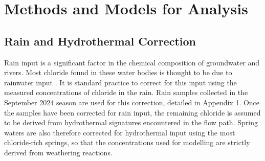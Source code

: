 



\newpage

\section{Methods and Models for Analysis}


\subsection{Rain and Hydrothermal Correction}

Rain input is a significant factor in the chemical composition of groundwater and rivers. Most chloride found in these water bodies is thought to be due to rainwater input \parencite{dreverGeochemistryNaturalWaters1997}. It is standard practice to correct for this input using the measured concentrations of chloride in the rain. Rain samples collected in the September 2024 season are used for this correction, detailed in Appendix 1. Once the samples have been corrected for rain input, the remaining chloride is assumed to be derived from hydrothermal signatures encountered in the flow path. Spring waters are also therefore corrected for hydrothermal input using the most chloride-rich springs, so that the concentrations used for modelling are strictly derived from weathering reactions.

